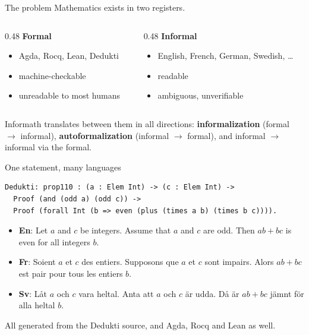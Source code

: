 \documentclass[10pt,aspectratio=169]{beamer}
\begin{document}
\begin{frame}{The problem}
  Mathematics exists in two registers.

  \begin{columns}[T]
    \begin{column}{0.48\textwidth}
      \textbf{Formal}
      \begin{itemize}
        \item Agda, Rocq, Lean, Dedukti
        \item machine-checkable
        \item unreadable to most humans
      \end{itemize}
    \end{column}
    \begin{column}{0.48\textwidth}
      \textbf{Informal}
      \begin{itemize}
        \item English, French, German, Swedish, \dots
        \item readable
        \item ambiguous, unverifiable
      \end{itemize}
    \end{column}
  \end{columns}

  \vspace{1em}
  Informath translates between them in all directions:
  \textbf{informalization} (formal $\to$ informal),
  \textbf{autoformalization} (informal $\to$ formal),
  and informal $\to$ informal via the formal.
\end{frame}

\begin{frame}[fragile]{One statement, many languages}
\begin{lstlisting}
Dedukti: prop110 : (a : Elem Int) -> (c : Elem Int) ->
  Proof (and (odd a) (odd c)) ->
  Proof (forall Int (b => even (plus (times a b) (times b c)))).
\end{lstlisting}

\begin{itemize}\footnotesize
  \item \textbf{En}: Let $a$ and $c$ be integers. Assume that $a$ and $c$ are odd.
        Then $ab + bc$ is even for all integers $b$.
  \item \textbf{Fr}: Soient $a$ et $c$ des entiers. Supposons que $a$ et $c$ sont impairs.
        Alors $ab+bc$ est pair pour tous les entiers $b$.
  \item \textbf{Sv}: Låt $a$ och $c$ vara heltal. Anta att $a$ och $c$ är udda.
        Då är $ab + bc$ jämnt för alla heltal $b$.
\end{itemize}

\footnotesize All generated from the Dedukti source, and Agda, Rocq and Lean as well.
\end{frame}
\end{document}
